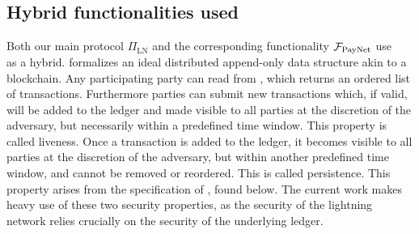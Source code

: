 
  \subsection{Hybrid functionalities used}
    Both our main protocol $\Pi_{\mathrm{LN}}$ and the corresponding
    functionality $\mathcal{F}_{\mathrm{PayNet}}{}$ use
    \ledger~\cite{BMTZ17,genesis} as a hybrid. \ledger{} formalizes an ideal
    distributed append-only data structure akin to a blockchain. Any
    participating party can read from \ledger, which returns an ordered list
    of transactions. Furthermore parties can submit new transactions which, if
    valid, will be added to the ledger and made visible to all parties
    at the discretion of the adversary, but necessarily within a predefined time
    window. This property is called liveness. Once a transaction is added to the
    ledger, it becomes visible to all parties at the discretion of the
    adversary, but within another predefined time window, and cannot be removed
    or reordered. This is called persistence. This property arises from the
    specification of \ledger, found below. The current work makes
    heavy use of these two security properties, as the security of the lightning
    network relies crucially on the security of the underlying ledger.

